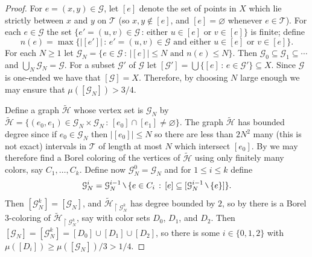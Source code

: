 \documentclass[11pt]{amsart}
\theoremstyle{definition}
\theoremstyle{plain}
\newcommand{\<}{\langle}
\renewcommand{\>}{\rangle}
\renewcommand{\emptyset}{\varnothing}
\newcommand{\Ggraph}{\mathcal{G}}
\newcommand{\Hgraph}{\mathcal{H}}
\newcommand{\Tgraph}{\mathcal{T}}
\newcommand{\mysetminusD}{\hbox{\tikz{\draw[line width=0.6pt,line cap=round] (3pt,0) -- (0,6pt);}}}
\newcommand{\mysetminusT}{\mysetminusD}
\newcommand{\mysetminusS}{\hbox{\tikz{\draw[line width=0.45pt,line cap=round] (2pt,0) -- (0,4pt);}}}
\newcommand{\mysetminusSS}{\hbox{\tikz{\draw[line width=0.4pt,line cap=round] (1.5pt,0) -- (0,3pt);}}}
\newcommand{\mysetminus}{\mathbin{\mathchoice{\mysetminusD}{\mysetminusT}{\mysetminusS}{\mysetminusSS}}}%
\begin{document}
\begin{proof}
For $e=(x,y)\in {\Ggraph}$, let $[e]$ denote the set of points in $X$ which lie strictly between $x$ and $y$ on ${\Tgraph}$ (so $x,y\not\in [e]$, and $[e]=\emptyset$ whenever $e\in {\Tgraph}$). For each $e\in {\Ggraph}$ the set $\{ e'=(u,v) \in {\Ggraph}\, : \, \text{either } u\in [e] \text{ or }v\in [e] \}$ is finite; define
\[
n(e) = \max \{ |[e']| \, : \, e'=(u,v)\in {\Ggraph} \text{ and either } u\in [e] \text{ or }v\in [e] \} .
\]
For each $N\geq 1$ let ${\Ggraph}_N = \{ e\in {\Ggraph} \, : \, |[e]|\leq N \text{ and } n(e) \leq N \}$. Then ${\Ggraph}_0\subseteq {\Ggraph}_1\subseteq \cdots$ and $\bigcup _N {\Ggraph}_N = {\Ggraph}$. For a subset ${\Ggraph}'$ of ${\Ggraph}$ let $[{\Ggraph}'] = \bigcup \{ [e] \, : \, e\in {\Ggraph}' \}\subseteq X$. Since ${\Ggraph}$ is one-ended we have that $[{\Ggraph}] = X$. Therefore, by choosing $N$ large enough we may ensure that $\mu ([{\Ggraph}_N] ) >3/4$.

Define a graph $\widetilde{{\Hgraph}}$ whose vertex set is ${\Ggraph}_N$ by
$\widetilde{{\Hgraph}} = \{ (e_0,e_1)\in {\Ggraph}_N\times {\Ggraph}_N \, :
\, [e_0]\cap [e_1] \neq \emptyset \}$. The graph $\widetilde{{\Hgraph}}$
has bounded degree since if $e_0 \in {\Ggraph}_N$ then $|[e_0]|\leq N$ so
there are less than $2N^2$ many (this is not exact) intervals in
${\Tgraph}$ of length at most $N$ which intersect $[e_0]$. By
\cite[Proposition 4.6]{KST99} we may therefore find a Borel coloring of the vertices of $\widetilde{{\Hgraph}}$ using only finitely many colors, say $C_1,\dots , C_k$. Define now ${\Ggraph}_N^0 = {\Ggraph}_N$ and for $1\leq i \leq k$ define
\[
{\Ggraph}^i_N= {\Ggraph}^{i-1}_N\mysetminus \{ e\in C_i \, : \, [e]\subseteq [{\Ggraph}^{i-1}_N\mysetminus \{ e \} ] \} .
\]
Then $[{\Ggraph}^k_N]= [{\Ggraph}_N]$, and $\widetilde{{\Hgraph}}_{\restriction
{\Ggraph}^k_N}$ has degree bounded by $2$, so by \cite[Proposition 4.6]{KST99} there is a Borel 3-coloring of $\widetilde{{\Hgraph}}_{\restriction  {\Ggraph}^k_N}$, say with color sets $D_0$, $D_1$, and $D_2$. Then $[{\Ggraph}_N] = [{\Ggraph}^k_N]=[D_0]\cup [D_1]\cup [D_2]$, so there is some $i\in \{ 0,1,2\}$ with $\mu ([D_i]) \geq \mu ([{\Ggraph}_N])/3 > 1/4$.


\end{proof}
\end{document}

